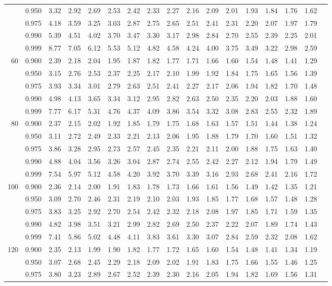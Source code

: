 \documentclass[pdftex,11pt,openany]{book}\usepackage[]{graphicx}\usepackage[]{color}
\begin{document}
{\begin{center}
\begin{tabular}{rrr@{\,}r@{\,}r@{\,}r@{\,}r@{\,}r@{\,}r@{\,}r
                   @{\,}r@{\,}r@{\,}r@{\,}r@{\,}r@{\,}r@{\,}r}
  &0.950&3.32&2.92&2.69&2.53&2.42&2.33&2.27&2.16&2.09&2.01&1.93&1.84&1.76&1.62\\
  &0.975&4.18&3.59&3.25&3.03&2.87&2.75&2.65&2.51&2.41&2.31&2.20&2.07&1.97&1.79\\
  &0.990&5.39&4.51&4.02&3.70&3.47&3.30&3.17&2.98&2.84&2.70&2.55&2.39&2.25&2.01\\
  &0.999&8.77&7.05&6.12&5.53&5.12&4.82&4.58&4.24&4.00&3.75&3.49&3.22&2.98&2.59\\
60&0.900&2.39&2.18&2.04&1.95&1.87&1.82&1.77&1.71&1.66&1.60&1.54&1.48&1.41&1.29\\
  &0.950&3.15&2.76&2.53&2.37&2.25&2.17&2.10&1.99&1.92&1.84&1.75&1.65&1.56&1.39\\
  &0.975&3.93&3.34&3.01&2.79&2.63&2.51&2.41&2.27&2.17&2.06&1.94&1.82&1.70&1.48\\
  &0.990&4.98&4.13&3.65&3.34&3.12&2.95&2.82&2.63&2.50&2.35&2.20&2.03&1.88&1.60\\
  &0.999&7.77&6.17&5.31&4.76&4.37&4.09&3.86&3.54&3.32&3.08&2.83&2.55&2.32&1.89\\
80&0.900&2.37&2.15&2.02&1.92&1.85&1.79&1.75&1.68&1.63&1.57&1.51&1.44&1.38&1.24\\
  &0.950&3.11&2.72&2.49&2.33&2.21&2.13&2.06&1.95&1.88&1.79&1.70&1.60&1.51&1.32\\
  &0.975&3.86&3.28&2.95&2.73&2.57&2.45&2.35&2.21&2.11&2.00&1.88&1.75&1.63&1.40\\
  &0.990&4.88&4.04&3.56&3.26&3.04&2.87&2.74&2.55&2.42&2.27&2.12&1.94&1.79&1.49\\
  &0.999&7.54&5.97&5.12&4.58&4.20&3.92&3.70&3.39&3.16&2.93&2.68&2.41&2.16&1.72\\
100
  &0.900&2.36&2.14&2.00&1.91&1.83&1.78&1.73&1.66&1.61&1.56&1.49&1.42&1.35&1.21\\
  &0.950&3.09&2.70&2.46&2.31&2.19&2.10&2.03&1.93&1.85&1.77&1.68&1.57&1.48&1.28\\
  &0.975&3.83&3.25&2.92&2.70&2.54&2.42&2.32&2.18&2.08&1.97&1.85&1.71&1.59&1.35\\
  &0.990&4.82&3.98&3.51&3.21&2.99&2.82&2.69&2.50&2.37&2.22&2.07&1.89&1.74&1.43\\
  &0.999&7.41&5.86&5.02&4.48&4.11&3.83&3.61&3.30&3.07&2.84&2.59&2.32&2.08&1.62\\
120
  &0.900&2.35&2.13&1.99&1.90&1.82&1.77&1.72&1.65&1.60&1.54&1.48&1.41&1.34&1.19\\
  &0.950&3.07&2.68&2.45&2.29&2.18&2.09&2.02&1.91&1.83&1.75&1.66&1.55&1.46&1.25\\
  &0.975&3.80&3.23&2.89&2.67&2.52&2.39&2.30&2.16&2.05&1.94&1.82&1.69&1.56&1.31\\

\end{tabular}
\end{center}}
\end{document}
